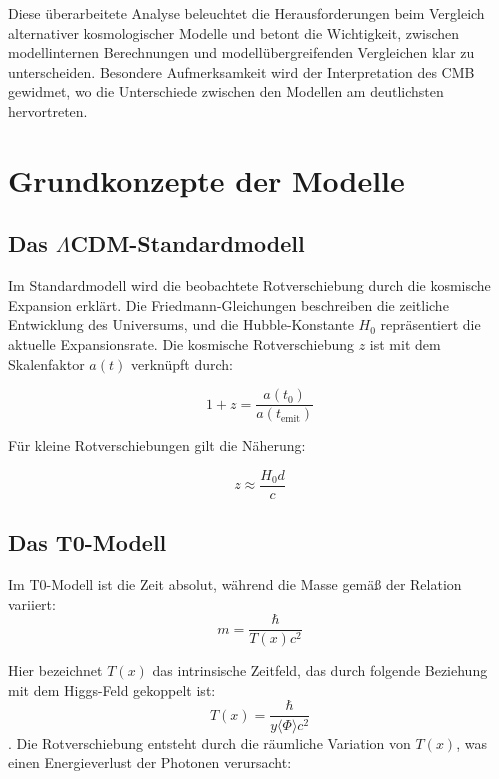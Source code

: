 \documentclass[a4paper,12pt]{article}
\newcommand{\LCDM}{\ensuremath{\Lambda}CDM}
\begin{document}
	Diese überarbeitete Analyse beleuchtet die Herausforderungen beim Vergleich alternativer kosmologischer Modelle und betont die Wichtigkeit, zwischen modellinternen Berechnungen und modellübergreifenden Vergleichen klar zu unterscheiden. Besondere Aufmerksamkeit wird der Interpretation des CMB gewidmet, wo die Unterschiede zwischen den Modellen am deutlichsten hervortreten.
	
	\section{Grundkonzepte der Modelle}
	
	\subsection{Das \LCDM-Standardmodell}
	
	Im Standardmodell \cite{Planck2018} wird die beobachtete Rotverschiebung durch die kosmische Expansion erklärt. Die Friedmann-Gleichungen beschreiben die zeitliche Entwicklung des Universums, und die Hubble-Konstante \( H_0 \) repräsentiert die aktuelle Expansionsrate. Die kosmische Rotverschiebung \( z \) ist mit dem Skalenfaktor \( a(t) \) verknüpft durch:
	
	\begin{equation}
		1 + z = \frac{a(t_0)}{a(t_{\text{emit}})}
	\end{equation}
	
	Für kleine Rotverschiebungen gilt die Näherung:
	
	\begin{equation}
		z \approx \frac{H_0 d}{c}
	\end{equation}
	
	\subsection{Das T0-Modell}
	
	Im T0-Modell \cite{Pascher2025e} ist die Zeit absolut, während die Masse gemäß der Relation variiert:
	\begin{equation}
		m = \frac{\hbar}{T(x) c^2}
	\end{equation}
	
	Hier bezeichnet \( T(x) \) das intrinsische Zeitfeld, das durch folgende Beziehung mit dem Higgs-Feld gekoppelt ist:
	\begin{equation}
		T(x) = \frac{\hbar}{y \langle \Phi \rangle c^2}
	\end{equation}
	\cite{Pascher2025b}. Die Rotverschiebung entsteht durch die räumliche Variation von \( T(x) \), was einen Energieverlust der Photonen verursacht:
	
\end{document}
